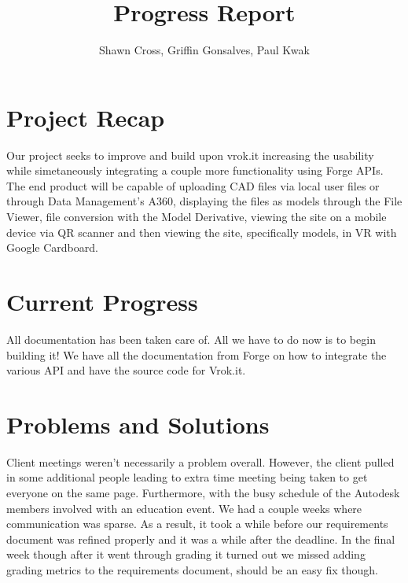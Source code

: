 \documentclass[10pt,draftclsnofoot,onecolumn]{IEEEtran}
\begin{document}
\title{Progress Report}
\author{Shawn Cross, Griffin Gonsalves, Paul Kwak}
\maketitle
\hspace*{\fill}\hspace*{\fill}
\vspace{2cm}
\begin{abstract}

\end{abstract}
\IEEEpeerreviewmaketitle

\newpage
{}

\section{Project Recap}
Our project seeks to improve and build upon vrok.it increasing the usability while simetaneously integrating a couple more functionality using Forge APIs. The end product will be capable of uploading CAD files via local user files or through Data Management’s A360, displaying the files as models through the File Viewer, file conversion with the Model Derivative, viewing the site on a mobile device via QR scanner and then viewing the site, specifically models, in VR with Google Cardboard.
\section{Current Progress}
All documentation has been taken care of. All we have to do now is to begin building it! We have all the documentation from Forge on how to integrate the various API and have the source code for Vrok.it.
\section{Problems and Solutions}
Client meetings weren’t necessarily a problem overall. However, the client pulled in some additional people leading to extra time meeting being taken to get everyone on the same page. Furthermore, with the busy schedule of the Autodesk members involved with an education event. We had a couple weeks where communication was sparse. As a result, it took a while before our requirements document was refined properly and it was a while after the deadline. In the final week though after it went through grading it turned out we missed adding grading metrics to the requirements document, should be an easy fix though. 
\end{document}
